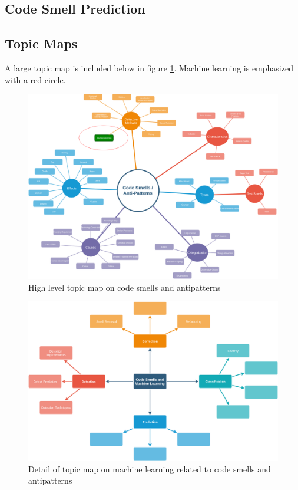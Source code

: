 \documentclass[conference]{IEEEtran}
\begin{document}
\subsection{Code Smell Prediction}

\subsection{Topic Maps}

A large topic map is included below in figure \ref{fig:TM}.
Machine learning is emphasized with a red circle. 
\begin{figure}[ht]
  \centerline{\includegraphics[width=\linewidth]{AntiPattern-TopicMap.png}}
  \caption{High level topic map on code smells and antipatterns}
  \label{fig:TM}
\end{figure} 

\begin{figure}[!ht]
  \centerline{\includegraphics[width=\textwidth]{ML-codesmells.png}}
  \caption{Detail of topic map on machine learning related to code smells and antipatterns}
  \label{fig:ML}
\end{figure} 
\end{document}
